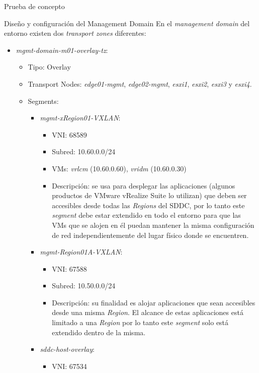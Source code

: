 \begin{section}{Prueba de concepto}
\begin{subsection}{Diseño y configuración del Management Domain}
    En el \textit{management domain} del entorno existen dos \textit{transport zones} diferentes:
    \begin{itemize}
      \item \textit{mgmt-domain-m01-overlay-tz}:
        \begin{itemize}
          \item Tipo: Overlay
          \item Transport Nodes: \textit{edge01-mgmt}, \textit{edge02-mgmt}, \textit{esxi1}, \textit{esxi2}, \textit{esxi3} y \textit{esxi4}.
          \item Segments:
            \begin{itemize}
              \item \textit{mgmt-xRegion01-VXLAN}:
                \begin{itemize}
                  \item VNI: 68589
                  \item Subred: 10.60.0.0/24
                  \item VMs: \textit{vrlcm} (10.60.0.60), \textit{vridm} (10.60.0.30)
                  \item Descripción: se usa para desplegar las aplicaciones (algunos productos de VMware vRealize Suite lo utilizan) que deben ser accesibles desde todas las \textit{Regions} del SDDC, por lo tanto este \textit{segment} debe estar extendido en todo el entorno para que las VMs que se alojen en él puedan mantener la misma configuración de red independientemente del lugar físico donde se encuentren.
                \end{itemize}
              \item \textit{mgmt-Region01A-VXLAN}:
                \begin{itemize}
                  \item VNI: 67588
                  \item Subred: 10.50.0.0/24
                  \item Descripción: su finalidad es alojar aplicaciones que sean accesibles desde una misma \textit{Region}. El alcance de estas aplicaciones está limitado a una \textit{Region} por lo tanto este \textit{segment} solo está extendido dentro de la misma.
                \end{itemize}
              \item \textit{sddc-host-overlay}:
                \begin{itemize}
                  \item VNI: 67534

\end{itemize}
\end{itemize}
\end{itemize}
\end{itemize}
\end{subsection}
\end{section}
